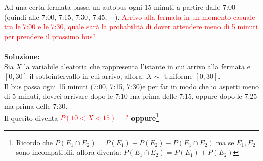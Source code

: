 \documentclass{article}  %
\theoremstyle{definition}
\begin{document}
\begin{esercizio}[Esercizio]
	Ad una certa fermata passa un autobus ogni 15 minuti a partire dalle 7:00 (quindi alle 7:00, 7:15, 7:30, 7:45, $\cdots$).
	\textcolor{red}{Arrivo alla fermata in un momento casuale tra le 7:00 e le 7:30, quale sarà la probabilità di dover attendere meno di 5 minuti per prendere il prossimo bus?} \\
	\\ \textbf{Soluzione:} \\
	Sia $X$ la variabile aleatoria che rappresenta l'istante in cui arrivo alla fermata e $[0,30]$ il sottointervallo in cui arrivo, allora: $X \sim$ Uniforme $[0,30]$. \\
	Il bus passa ogni 15 minuti (7:00, 7:15, 7:30)e per far in modo che io aspetti meno di 5 minuti, dovrei arrivare dopo le 7:10 ma prima delle 7:15, oppure dopo le 7:25 ma prima delle 7:30.
	\\
	Il quesito diventa \textcolor{red}{$P(10<X<15)=?$} \textbf{oppure}\footnote{
		Ricordo che $P(E_1 \cap E_2)=P(E_1)+P(E_2)-P(E_1 \cap E_2)$
		ma se $E_1,E_2$ sono incompatibili, allora diventa: $P(E_1 \cap E_2)=P(E_1)+P(E_2)$

}
\end{esercizio}
\end{document}
